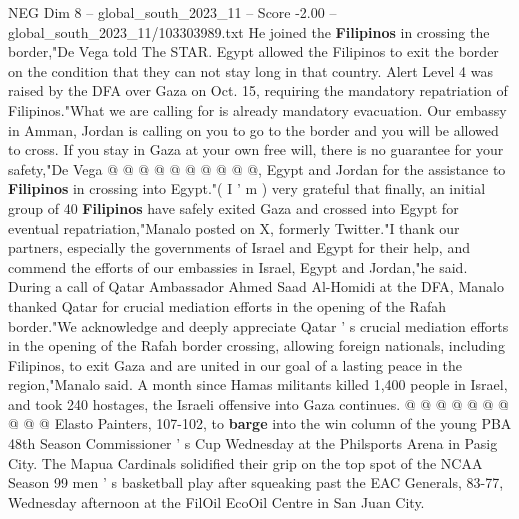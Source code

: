\begin{textsample}{NEG Dim 8 – global\_south\_2023\_11 – Score -2.00 – global\_south\_2023\_11/103303989.txt}
He joined the \textbf{Filipinos} in crossing the border,"De Vega told The STAR.
Egypt allowed the Filipinos to exit the border on the condition that they can not stay long in that country.
Alert Level 4 was raised by the DFA over Gaza on Oct. 15, requiring the mandatory repatriation of Filipinos."What we are calling for is already mandatory evacuation.
Our embassy in Amman, Jordan is calling on you to go to the border and you will be allowed to cross.
If you stay in Gaza at your own free will, there is no guarantee for your safety,"De Vega @ @ @ @ @ @ @ @ @ @, Egypt and Jordan for the assistance to \textbf{Filipinos} in crossing into Egypt."( I ' m ) very grateful that finally, an initial group of 40 \textbf{Filipinos} have safely exited Gaza and crossed into Egypt for eventual repatriation,"Manalo posted on X, formerly Twitter."I thank our partners, especially the governments of Israel and Egypt for their help, and commend the efforts of our embassies in Israel, Egypt and Jordan,"he said.
During a call of Qatar Ambassador Ahmed Saad Al-Homidi at the DFA, Manalo thanked Qatar for crucial mediation efforts in the opening of the Rafah border."We acknowledge and deeply appreciate Qatar ' s crucial mediation efforts in the opening of the Rafah border crossing, allowing foreign nationals, including Filipinos, to exit Gaza and are united in our goal of a lasting peace in the region,"Manalo said.
A month since Hamas militants killed 1,400 people in Israel, and took 240 hostages, the Israeli offensive into Gaza continues. @ @ @ @ @ @ @ @ @ @ Elasto Painters, 107-102, to \textbf{barge} into the win column of the young PBA 48th Season Commissioner ' s Cup Wednesday at the Philsports Arena in Pasig City.
The Mapua Cardinals solidified their grip on the top spot of the NCAA Season 99 men ' s basketball play after squeaking past the EAC Generals, 83-77, Wednesday afternoon at the FilOil EcoOil Centre in San Juan City.

\end{textsample}
